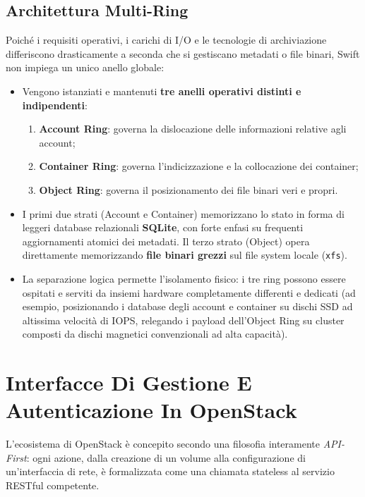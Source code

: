 \documentclass[11pt, a4paper]{article}
\begin{document}
\subsection{Architettura Multi-Ring}

Poiché i requisiti operativi, i carichi di I/O e le tecnologie di archiviazione differiscono drasticamente a seconda che si gestiscano metadati o file binari, Swift non impiega un unico anello globale:
\begin{itemize}[noitemsep]
    \item Vengono istanziati e mantenuti \textbf{tre anelli operativi distinti e indipendenti}:
    \begin{enumerate}
        \item \textbf{Account Ring}: governa la dislocazione delle informazioni relative agli account;
        \item \textbf{Container Ring}: governa l'indicizzazione e la collocazione dei container;
        \item \textbf{Object Ring}: governa il posizionamento dei file binari veri e propri.
    \end{enumerate}
    \item I primi due strati (Account e Container) memorizzano lo stato in forma di leggeri database relazionali \textbf{SQLite}, con forte enfasi su frequenti aggiornamenti atomici dei metadati. Il terzo strato (Object) opera direttamente memorizzando \textbf{file binari grezzi} sul file system locale (\texttt{xfs}).
    \item La separazione logica permette l'isolamento fisico: i tre ring possono essere ospitati e serviti da insiemi hardware completamente differenti e dedicati (ad esempio, posizionando i database degli account e container su dischi SSD ad altissima velocità di IOPS, relegando i payload dell'Object Ring su cluster composti da dischi magnetici convenzionali ad alta capacità).
\end{itemize}

\newpage

\section{Interfacce Di Gestione E Autenticazione In OpenStack}

L'ecosistema di OpenStack è concepito secondo una filosofia interamente \emph{API-First}: ogni azione, dalla creazione di un volume alla configurazione di un'interfaccia di rete, è formalizzata come una chiamata stateless al servizio RESTful competente.
\end{document}
